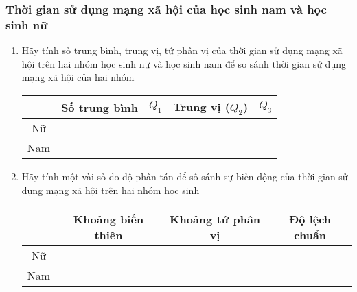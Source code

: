 \subsubsection{Thời gian sử dụng mạng xã hội của học sinh nam và học sinh nữ}
\begin{enumerate}
	\item Hãy tính số trung bình, trung vị, tứ phân vị của thời gian sử dụng mạng xã hội trên hai nhóm học sinh nữ và học sinh nam để so sánh thời gian sử dụng mạng xã hội của hai nhóm
\begin{center}
		\begin{tabular}{|c|c|c|c|c|}
		\hline
		& Số trung bình & $Q_1$ & Trung vị ($Q_2$) & $Q_3$\\
		\hline
		Nữ & & & &\\
		\hline
		Nam & & & &\\
		\hline
	\end{tabular}
\end{center}
	\item Hãy tính một vài số đo độ phân tán để sô sánh sự biến động của thời gian sử dụng mạng xã hội trên hai nhóm học sinh
\begin{center}
		\begin{tabular}{|c|c|c|c|}
		\hline
		& Khoảng biến thiên & Khoảng tứ phân vị & Độ lệch chuẩn\\
		\hline
		Nữ & & &\\
		\hline
		Nam & & &\\
		\hline
	\end{tabular}
\end{center}
\end{enumerate}
